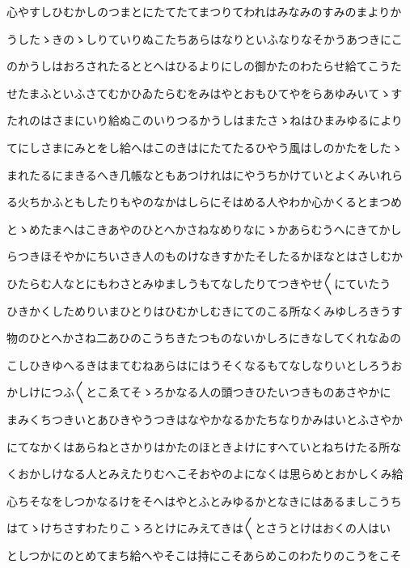 \documentclass[a4paper,11pt,landscape]{ltjtarticle}
\begin{document}
\par\medskip
心やすしひむかしのつまとにたてたてまつりてわれはみなみのすみのまよりか
\par\medskip
うしたゝきのゝしりていりぬこたちあらはなりといふなりなそかうあつきにこ
\par\medskip
のかうしはおろされたるととへはひるよりにしの御かたのわたらせ給てこうた
\par\medskip
せたまふといふさてむかひゐたらむをみはやとおもひてやをらあゆみいてゝす
\par\medskip
たれのはさまにいり給ぬこのいりつるかうしはまたさゝねはひまみゆるにより
\par\medskip
てにしさまにみとをし給へはこのきはにたてたるひやう風はしのかたをしたゝ
\par\medskip
まれたるにまきるへき几帳なともあつけれはにやうちかけていとよくみいれら
\par\medskip
る火ちかふともしたりもやのなかはしらにそはめる人やわか心かくるとまつめ
\par\medskip
とゝめたまへはこきあやのひとへかさねなめりなにゝかあらむうへにきてかし
\par\medskip
らつきほそやかにちいさき人のものけなきすかたそしたるかほなとはさしむか
\par\medskip
ひたらむ人なとにもわさとみゆましうもてなしたりてつきやせ〱にていたう
\par\medskip
ひきかくしためりいまひとりはひむかしむきにてのこる所なくみゆしろきうす
\par\medskip
物のひとへかさね二あひのこうちきたつものないかしろにきなしてくれなゐの
\par\medskip
こしひきゆへるきはまてむねあらはにはうそくなるもてなしなりいとしろうお
\par\medskip
かしけにつふ〱とこゑてそゝろかなる人の頭つきひたいつきものあさやかに
\par\medskip
まみくちつきいとあひきやうつきはなやかなるかたちなりかみはいとふさやか
\par\medskip
にてなかくはあらねとさかりはかたのほときよけにすへていとねちけたる所な
\par\medskip
くおかしけなる人とみえたりむへこそおやのよになくは思らめとおかしくみ給
\par\medskip
心ちそなをしつかなるけをそへはやとふとみゆるかとなきにはあるましこうち
\par\medskip
はてゝけちさすわたりこゝろとけにみえてきは〱とさうとけはおくの人はい
\par\medskip
としつかにのとめてまち給へやそこは持にこそあらめこのわたりのこうをこそ
\par\medskip
\end{document}
